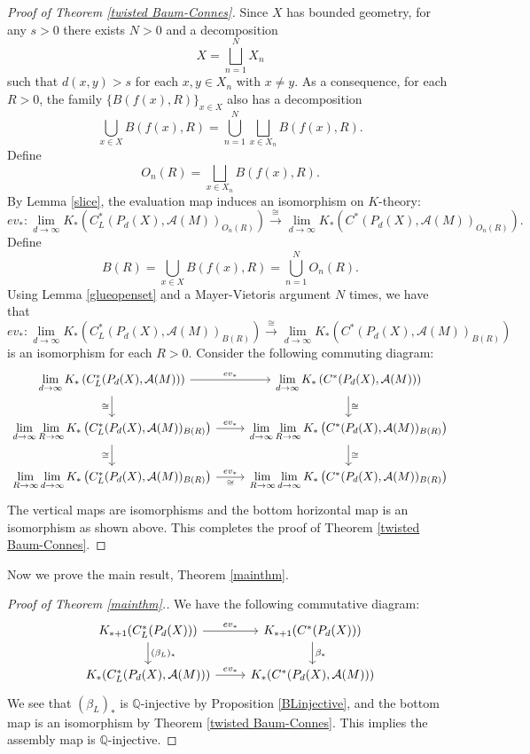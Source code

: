 \documentclass{article}
\theoremstyle{plain}
\theoremstyle{definition}
\theoremstyle{remark}
\begin{document}
	\begin{proof}[Proof of Theorem \ref{twisted Baum-Connes}]
		Since $X$ has bounded geometry, for any $s>0$ there exists $N>0$ and a decomposition
		$$X=\bigsqcup_{n=1}^{N}X_n$$
		such that $d(x,y)>s$ for each $x,y\in X_n$ with $x\neq y$. As a consequence, for each $R>0$, the family $\{B(f(x),R)\}_{x\in X}$ also has a decomposition
		$$\bigcup_{x\in X}B(f(x),R)=\bigcup_{n=1}^{N}\bigsqcup_{x\in X_n}B(f(x),R).$$ Define
		$$O_n(R)=\bigsqcup_{x\in X_n}B(f(x),R).$$
		By Lemma \ref{slice}, the evaluation map induces an isomorphism on $K$-theory:
		$$ev_*:\lim_{d\to\infty}K_*\left(C^*_L(P_d(X),\mathcal A(M))_{O_n(R)}\right)\xrightarrow{\cong}\lim_{d\to\infty}K_*\left(C^*(P_d(X),\mathcal A(M))_{O_n(R)}\right).$$
		Define
		$$B(R)=\bigcup_{x\in X}B(f(x),R)=\bigcup_{n=1}^{N}O_n(R).$$
		Using Lemma \ref{glueopenset} and a Mayer-Vietoris argument $N$ times, we have that
		$$ev_*:\lim_{d\to\infty}K_*\left(C^*_L(P_d(X),\mathcal A(M))_{B(R)}\right)\xrightarrow{\cong}\lim_{d\to\infty}K_*\left(C^*(P_d(X),\mathcal A(M))_{B(R)}\right)$$
		is an isomorphism for each $R>0$. Consider the following commuting diagram:
		$$\begin{tikzcd}
			\lim\limits_{d\to\infty}K_*\left(C^*_L(P_d(X),\mathcal A(M))\right) \arrow[r,"ev_*"] \arrow[d,"\cong"'] & 
			\lim\limits_{d\to\infty}K_*\left(C^*(P_d(X),\mathcal A(M))\right) \arrow[d,"\cong"] \\
			\lim\limits_{d\to\infty}\lim\limits_{R\to\infty}K_*\left(C^*_L(P_d(X),\mathcal A(M))_{B(R)}\right) \arrow[r,"ev_*"] \arrow[d,"\cong"'] & 
			\lim\limits_{d\to\infty}\lim\limits_{R\to\infty}K_*\left(C^*(P_d(X),\mathcal A(M))_{B(R)}\right) \arrow[d,"\cong"] \\
			\lim\limits_{R\to\infty}\lim\limits_{d\to\infty}K_*\left(C^*_L(P_d(X),\mathcal A(M))_{B(R)}\right) \arrow[r,"ev_*","\cong"']           & 
			\lim\limits_{R\to\infty}\lim\limits_{d\to\infty}K_*\left(C^*(P_d(X),\mathcal A(M))_{B(R)}\right)         
		\end{tikzcd}$$
		The vertical maps are isomorphisms and the bottom horizontal map is an isomorphism as shown above. This completes the proof of Theorem \ref{twisted Baum-Connes}.
	\end{proof}
	
	Now we prove the main result, Theorem \ref{mainthm}.
	\begin{proof}[Proof of Theorem \ref{mainthm}.]
		We have the following commutative diagram:
		\[\begin{tikzcd}
			K_{*+1}(C^*_L(P_d(X))) \arrow[r, "ev_*"] \arrow[d, "(\beta_L)_*"] & K_{*+1}(C^*(P_d(X))) \arrow[d, "\beta_*"]   \\
			K_*(C^*_L(P_d(X),\mathcal A(M)))\arrow[r, "ev_*"]& K_*(C^*(P_d(X),\mathcal A(M)))
		\end{tikzcd}\]
		We see that $(\beta_L)_*$ is $\mathbb{Q}$-injective by Proposition \ref{BLinjective}, and the bottom map is an isomorphism by Theorem \ref{twisted Baum-Connes}. This implies the assembly map is $\mathbb{Q}$-injective.
	\end{proof}
	
\end{document}
